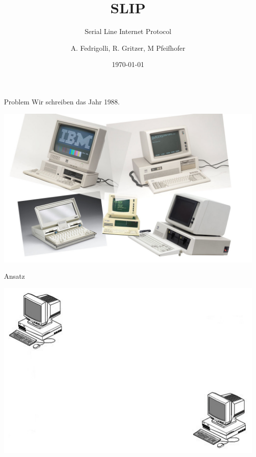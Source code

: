 \documentclass[beamer]{uibk}
\title{SLIP}
\subtitle{Serial Line Internet Protocol}
\author{A. Fedrigolli, R. Gritzer, M Pfeifhofer }
\date{\today}
\begin{document}
\maketitle

\begin{frame}{Problem}
  Wir schreiben das Jahr 1988.

  \includegraphics[width=\textwidth,height=\textheight,keepaspectratio]{1988computer.jpg}

\end{frame}

\begin{frame}{Ansatz}
  \begin{center}
  \includegraphics[width=\textwidth,height=\textheight,keepaspectratio]{ansatz_1.jpg}
  \end{center}
\end{frame}
\end{document}
